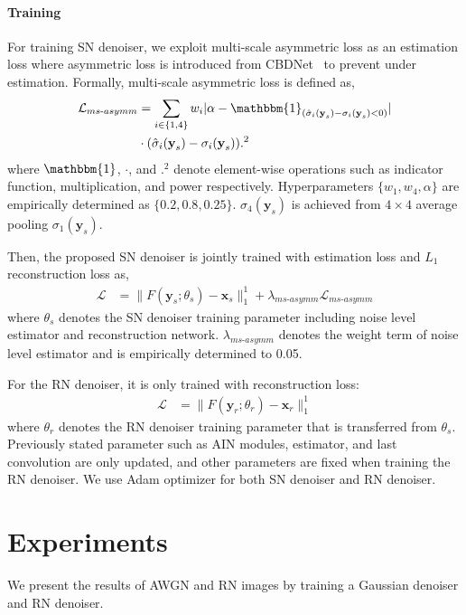 \documentclass[10pt,twocolumn,letterpaper]{article}
\begin{document}
\paragraph{Training}
For training SN denoiser, we exploit multi-scale asymmetric loss as an estimation loss where asymmetric loss is introduced from CBDNet~\cite{guo2019toward} to prevent under estimation.
Formally, multi-scale asymmetric loss is defined as,
\begin{align}
\mathcal{L}_{ms\text{-}asymm} &= 
\sum_{i\in\{1,4\}}w_i |\alpha -  \mathbbm{1}_{(\hat{\sigma}_i(\textbf{y}_s) - \sigma_i(\textbf{y}_s) < 0)}| \\ &\cdot(\hat{\sigma}_i(\textbf{y}_s)-\sigma_i(\textbf{y}_s) ).^2 \nonumber
\end{align}
where $\mathbbm{1}$, $\cdot$, and $.^2$ denote element-wise operations such as indicator function, multiplication, and power respectively.
Hyperparameters $\{w_1, w_4, \alpha\}$ are empirically determined as $\{0.2, 0.8, 0.25\}$.
$\sigma_4(\textbf{y}_s)$ is achieved from $4 \times 4$ average pooling $\sigma_1(\textbf{y}_s)$.

Then, the proposed SN denoiser is jointly trained with estimation loss and $L_1$ reconstruction loss as,
\begin{align}
\mathcal{L} &= \|F(\textbf{y}_s;\theta_s) - \textbf{x}_s\|^1_1 + \lambda_{ms\text{-}asymm}\mathcal{L}_{ms\text{-}asymm}  
\end{align}
where $\theta_s$ denotes the SN denoiser training parameter including noise level estimator and reconstruction network.
$\lambda_{ms\text{-}asymm}$ denotes the weight term of noise level estimator and is empirically determined to 0.05.

For the RN denoiser, it is only trained with reconstruction loss:
\begin{align}
	\mathcal{L} &= \| F(\textbf{y}_r;\theta_r) - \textbf{x}_r \|^1_1 
\end{align}
where $\theta_r$ denotes the RN denoiser training parameter that is transferred from $\theta_s$. 
Previously stated parameter such as AIN modules, estimator, and last convolution are only updated, and other parameters are fixed when training the RN denoiser.
We use Adam optimizer for both SN denoiser and RN denoiser.

 
\section{Experiments}
We present the results of AWGN and RN images by training a Gaussian denoiser and RN denoiser.
 
\end{document}
